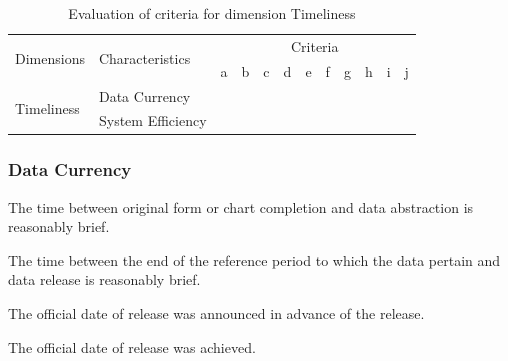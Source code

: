 \begin{table}[htbp]
    \centering

    \begin{tabular}{llrrrrrrrrrr}
        \toprule
        \multirow{2}{*}{Dimensions} & \multirow{2}{*}{Characteristics}  & \multicolumn{10}{c}{Criteria}         \\ \cmidrule(lr){3-12}
                                    &                                   & a & b & c & d & e & f & g & h & i & j \\ \midrule
        \multirow{2}{*}{Timeliness}   & Data Currency                     &   &   &   &   &   &   &   &   &   &   \\
                                    & System Efficiency                 &   &   &   &   &   &   &   &   &   &   \\
        \bottomrule
    \end{tabular}

    \caption{Evaluation of criteria for dimension Timeliness}
    \label{table:timeliness-benchmark}
\end{table}
\FloatBarrier

\subsubsection{Data Currency}

\begin{QandA}
    \item The time between original form or chart completion and data abstraction is reasonably brief.
    \begin{answered}
        
    \end{answered}

    \item The time between the end of the reference period to which the data pertain and data release is reasonably brief.
    \begin{answered}
        
    \end{answered}

    \item The official date of release was announced in advance of the release.
    \begin{answered}
        
    \end{answered}

    \item The official date of release was achieved.
    \begin{answered}
        
    \end{answered}

\end{QandA}

